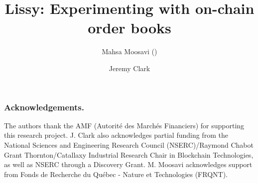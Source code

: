 \documentclass[envcountsect]{llncs}
\begin{document}
\frontmatter
\mainmatter

\title{\Large \bf Lissy: Experimenting with on-chain order books}



\author{Mahsa Moosavi () \and Jeremy Clark}



\maketitle











\subsubsection*{Acknowledgements.}  The authors thank the AMF (Autorité des Marchés Financiers) for supporting this research project. J. Clark also acknowledges partial funding from the National Sciences and Engineering Research Council (NSERC)/Raymond Chabot Grant Thornton/Catallaxy Industrial Research Chair in Blockchain Technologies, as well as NSERC through a Discovery Grant. M. Moosavi acknowledges support from Fonds de Recherche du Québec - Nature et Technologies (FRQNT).








%
\end{document}
